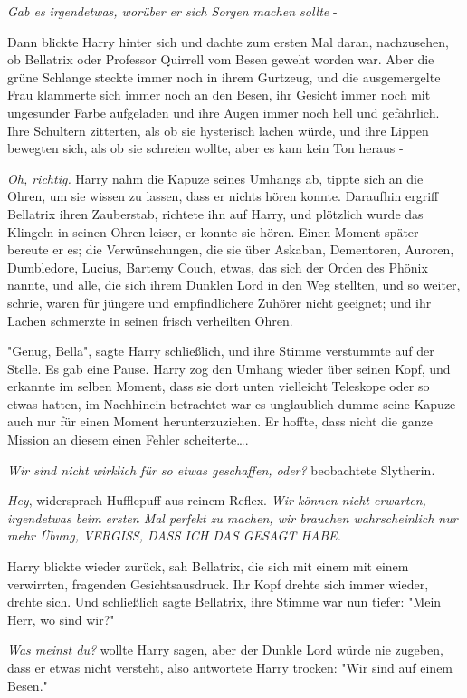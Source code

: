 {\emph{Gab es irgendetwas, worüber er sich Sorgen machen sollte} -

Dann blickte Harry hinter sich und dachte zum ersten Mal daran, nachzusehen, ob Bellatrix oder Professor Quirrell vom Besen geweht worden war. Aber die grüne Schlange steckte immer noch in ihrem Gurtzeug, und die ausgemergelte Frau klammerte sich immer noch an den Besen, ihr Gesicht immer noch mit ungesunder Farbe aufgeladen und ihre Augen immer noch hell und gefährlich. Ihre Schultern zitterten, als ob sie hysterisch lachen würde, und ihre Lippen bewegten sich, als ob sie schreien wollte, aber es kam kein Ton heraus -

\emph{Oh, richtig.} Harry nahm die Kapuze seines Umhangs ab, tippte sich an die Ohren, um sie wissen zu lassen, dass er nichts hören konnte. Daraufhin ergriff Bellatrix ihren Zauberstab, richtete ihn auf Harry, und plötzlich wurde das Klingeln in seinen Ohren leiser, er konnte sie hören. Einen Moment später bereute er es; die Verwünschungen, die sie über Askaban, Dementoren, Auroren, Dumbledore, Lucius, Bartemy Couch, etwas, das sich der Orden des Phönix nannte, und alle, die sich ihrem Dunklen Lord in den Weg stellten, und so weiter, schrie, waren für jüngere und empfindlichere Zuhörer nicht geeignet; und ihr Lachen schmerzte in seinen frisch verheilten Ohren.

"Genug, Bella", sagte Harry schließlich, und ihre Stimme verstummte auf der Stelle. Es gab eine Pause. Harry zog den Umhang wieder über seinen Kopf, und erkannte im selben Moment, dass sie dort unten vielleicht Teleskope oder so etwas hatten, im Nachhinein betrachtet war es unglaublich dumme seine Kapuze auch nur für einen Moment herunterzuziehen. Er hoffte, dass nicht die ganze Mission an diesem einen Fehler scheiterte….

\emph{Wir sind nicht wirklich für so etwas geschaffen, oder?} beobachtete Slytherin.

\emph{Hey}, widersprach Hufflepuff aus reinem Reflex. \emph{Wir können nicht erwarten, irgendetwas beim ersten Mal perfekt zu machen, wir brauchen wahrscheinlich nur mehr Übung, VERGISS, DASS ICH DAS GESAGT HABE.}

Harry blickte wieder zurück, sah Bellatrix, die sich mit einem mit einem verwirrten, fragenden Gesichtsausdruck. Ihr Kopf drehte sich immer wieder, drehte sich. Und schließlich sagte Bellatrix, ihre Stimme war nun tiefer: "Mein Herr, wo sind wir?"

\emph{Was meinst du?} wollte Harry sagen, aber der Dunkle Lord würde nie zugeben, dass er etwas nicht versteht, also antwortete Harry trocken: "Wir sind auf einem Besen."

}
